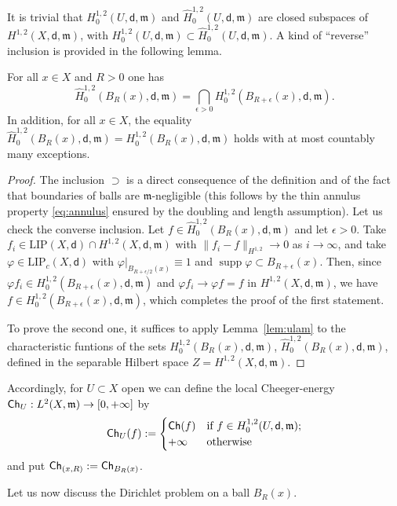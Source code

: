\documentclass[a4paper,11pt,reqno]{article}
\numberwithin{equation}{section}
\theoremstyle{plain}
\theoremstyle{definition}
\theoremstyle{remark}
\let\altphi\phi
\let\phi\varphi
\let\varphi\altphi
\let\altphi\undefined
\DeclareMathOperator{\supp}{supp}
\newcommand{\Ch}{{\sf Ch}}
\newcommand{\dist}{\mathsf{d}}
\newcommand{\meas}{\mathfrak{m}}
\begin{document}
It is trivial that $H^{1,2}_0(U,\dist,\meas)$ and $\hat{H}^{1,2}_0(U, \dist, \meas)$ are closed subspaces of $H^{1,2}(X, \dist, \meas)$,
with $H^{1,2}_0(U,\dist,\meas)\subset\hat{H}^{1,2}_0(U, \dist, \meas)$. A kind of ``reverse'' inclusion is provided in the
following lemma.

\begin{lemma}\label{lem:ch} For all $x\in X$ and $R>0$ one has
$$\hat{H}^{1,2}_0(B_R(x), \dist, \meas)=\bigcap_{\epsilon>0}H^{1,2}_0(B_{R+\epsilon}(x), \dist, \meas).$$ 
In addition, for all $x\in X$, the equality $\hat{H}^{1,2}_0(B_R(x), \dist, \meas)=H^{1,2}_0(B_R(x), \dist, \meas)$
holds with at most countably many exceptions.
\end{lemma}
\begin{proof} The inclusion $\supset$ is a direct consequence of the definition and of the fact that
boundaries of balls are $\meas$-negligible (this follows by the thin annulus property \eqref{eq:annulus} ensured by the
doubling and length assumption). Let us check the converse inclusion.
Let $f \in \hat{H}^{1,2}_0(B_R(x), \dist, \meas)$ and let $\epsilon>0$.
Take $f_i \in \mathrm{LIP}(X, \dist) \cap H^{1, 2}(X, \dist, \meas)$ with $\|f_i -f\|_{H^{1, 2}} \to 0$ as $i \to \infty$, and take  $\phi \in \mathrm{LIP}_c(X, \dist)$ with $\phi|_{B_{R+\epsilon/2}(x)}\equiv 1$ and $\supp \phi \subset B_{R+\epsilon}(x)$.
Then, since $\phi f_i \in H^{1,2}_0(B_{R+\epsilon}(x), \dist, \meas)$ and $\phi f_i \to \phi f=f$ in $H^{1, 2}(X, \dist, \meas)$, 
we have $f \in H^{1,2}_0(B_{R+\epsilon}(x), \dist, \meas)$, which completes the proof of the first statement.

To prove the second one, it suffices to apply Lemma~\ref{lem:ulam} to the characteristic funtions of the
sets $H^{1,2}_0(B_R(x),\dist,\meas)$, $\hat{H}^{1,2}_0(B_R(x),\dist,\meas)$, defined in the separable Hilbert space 
$Z=H^{1,2}(X,\dist,\meas)$.
\end{proof}

Accordingly, for $U\subset X$ open we can define the local Cheeger-energy $\Ch_U:L^2(X, \meas) \to [0, +\infty]$ by 
\begin{equation}\label{eq:local energy}
\Ch_U(f):=
\begin{cases}\Ch(f) &\text{if $f\in H^{1, 2}_0(U, \dist, \meas)$;}\\
+\infty &\text{otherwise}
\end{cases}
\end{equation}
and put $\Ch_{(x,R)}:=\Ch_{B_R(x)}$.

Let us now discuss the Dirichlet problem on a ball $B_R(x)$.
\end{document}
